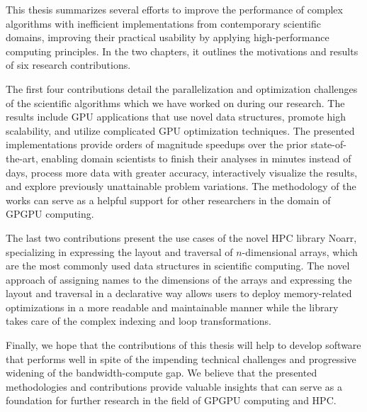 
This thesis summarizes several efforts to improve the performance of complex algorithms with inefficient implementations from contemporary scientific domains, improving their practical usability by applying high-performance computing principles. In the two chapters, it outlines the motivations and results of six research contributions.

The first four contributions detail the parallelization and optimization challenges of the scientific algorithms which we have worked on during our research. The results include GPU applications that use novel data structures, promote high scalability, and utilize complicated GPU optimization techniques. The presented implementations provide orders of magnitude speedups over the prior state-of-the-art, enabling domain scientists to finish their analyses in minutes instead of days, process more data with greater accuracy, interactively visualize the results, and explore previously unattainable problem variations. The methodology of the works can serve as a helpful support for other researchers in the domain of GPGPU computing.

The last two contributions present the use cases of the novel HPC library Noarr, specializing in expressing the layout and traversal of $n$-dimensional arrays, which are the most commonly used data structures in scientific computing. The novel approach of assigning names to the dimensions of the arrays and expressing the layout and traversal in a declarative way allows users to deploy memory-related optimizations in a more readable and maintainable manner while the library takes care of the complex indexing and loop transformations.

Finally, we hope that the contributions of this thesis will help to develop software that performs well in spite of the impending technical challenges and progressive widening of the bandwidth-compute gap. We believe that the presented methodologies and contributions provide valuable insights that can serve as a foundation for further research in the field of GPGPU computing and HPC.
